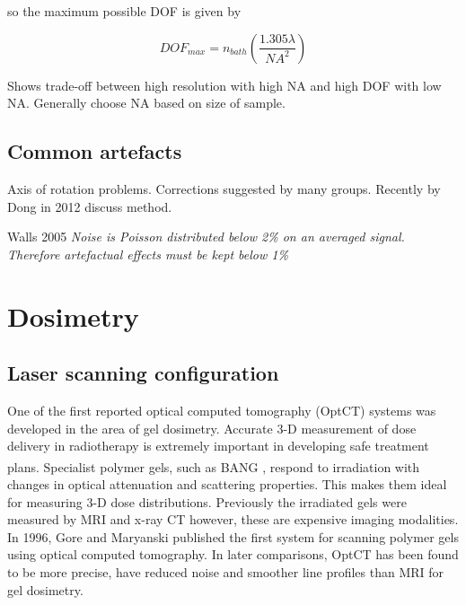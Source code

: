\documentclass[12pt]{article}
\begin{document}
so the maximum possible DOF is given by

\begin{equation}
DOF_{max} = n_{bath}(\dfrac{1.305\lambda}{NA^{2}})
\end{equation}

Shows trade-off between high resolution with high NA and high DOF with low NA. Generally choose NA based on size of sample.

\subsection{Common artefacts}

Axis of rotation problems. Corrections suggested by many groups. Recently by Dong in 2012 \cite{Dong:2012}  discuss method.

Walls 2005 \textit{Noise is Poisson distributed below 2\% on an averaged signal. Therefore artefactual effects must be kept below 1\%}


\newpage
\section{Dosimetry}
\label{sec:dos}
\subsection{Laser scanning configuration}


One of the first reported optical computed tomography (OptCT) systems was developed in the area of gel dosimetry. Accurate 3-D measurement of dose delivery in radiotherapy is extremely important in developing safe treatment plans. Specialist polymer gels, such as BANG\textsuperscript{\textregistered} \cite{Maryanski:1996}, respond to irradiation with changes in optical attenuation and scattering properties.  This makes them ideal for measuring 3-D dose distributions. Previously the irradiated gels were measured by MRI and x-ray CT however, these are expensive imaging modalities. In 1996, Gore and Maryanski published the first system for scanning polymer gels using optical computed tomography. \cite{Gore:1999tg} In later comparisons, OptCT has been found to be more precise, have reduced noise and smoother line profiles than MRI for gel dosimetry. \cite{Oldham:2001gs}
\end{document}
